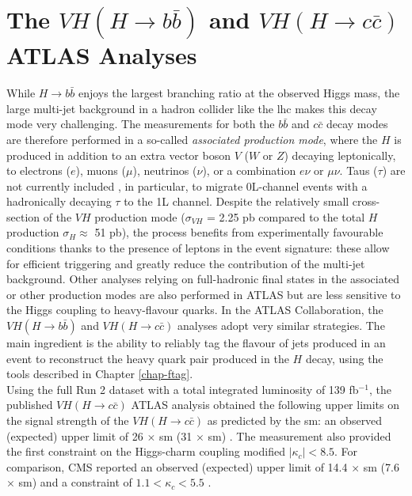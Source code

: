 \section{The $VH (H \rightarrow b\bar{b})$ and $VH (H \rightarrow c\bar{c})$ ATLAS Analyses}
While $H \rightarrow b\bar{b}$ enjoys the largest branching ratio at the observed Higgs mass, the large multi-jet background in a hadron collider like the \gls{lhc} makes this decay mode very challenging. The measurements for both the $b\bar{b}$ and $c\bar{c}$ decay modes are therefore performed in a so-called \textit{associated production mode}, where the $H$ is produced in addition to an extra vector boson $V$ ($W$ or $Z$) decaying leptonically, to electrons ($e$), muons ($\mu$), neutrinos ($\nu$), or a combination $e\nu$ or $\mu\nu$. Taus ($\tau$) are not currently included , in particular, to migrate 0L-channel events with a hadronically decaying $\tau$ to the 1L channel. Despite the relatively small cross-section of the $VH$ production mode ($\sigma_{VH}$ = 2.25 pb compared to the total $H$ production $\sigma_H \approx$ 51 pb), the process benefits from experimentally favourable conditions thanks to the presence of leptons in the event signature: these allow for efficient triggering and greatly reduce the contribution of the multi-jet background. Other analyses relying on full-hadronic final states in the associated or other production modes are also performed in ATLAS but are less sensitive to the Higgs coupling to heavy-flavour quarks. In the ATLAS Collaboration, the $VH (H\rightarrow b\bar{b})$ and $VH (H\rightarrow c\bar{c})$ analyses adopt very similar strategies. The main ingredient is the ability to reliably tag the flavour of jets produced in an event to reconstruct the heavy quark pair produced in the $H$ decay, using the tools described in Chapter \ref{chap-ftag}. \\ %

Using the full Run 2 dataset with a total integrated luminosity of 139 fb$^{-1}$, the published $VH (H\rightarrow c\bar{c})$ ATLAS analysis obtained the following upper limits on the signal strength of the $VH (H\rightarrow c\bar{c})$ as predicted by the \gls{sm}: an observed (expected) upper limit of 26 $\times$ \gls{sm} (31 $\times$ \gls{sm}) \cite{Collaboration:2721696}. The measurement also provided the first constraint on the Higgs-charm coupling modified $|\kappa_c| < 8.5$. For comparison, CMS reported an observed (expected) upper limit of 14.4 $\times$ \gls{sm} (7.6 $\times$ \gls{sm}) and a constraint of $1.1 < \kappa_c < 5.5$ \cite{arXiv:2205.05550}. \\  %

